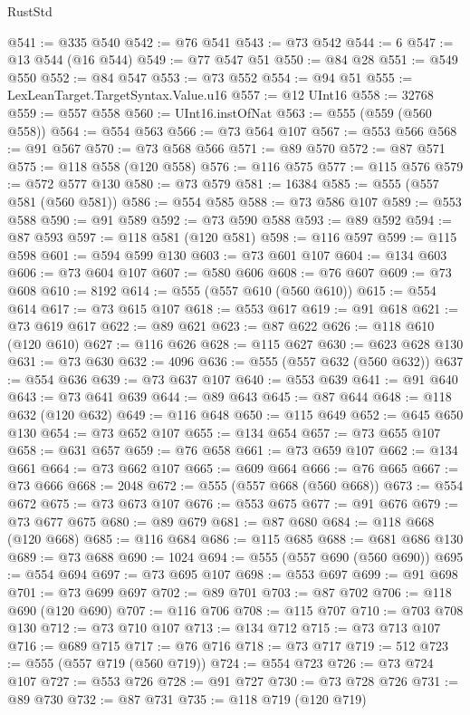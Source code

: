 \begin{lexlean}{RustStd}
\begin{coremodule}
@541 := @335 @540
@542 := @76 @541
@543 := @73 @542
@544 := 6
@547 := @13 @544 (@16 @544)
@549 := @77 @547 @51
@550 := @84 @28
@551 := @549 @550
@552 := @84 @547
@553 := @73 @552
@554 := @94 @51
@555 := LexLeanTarget.TargetSyntax.Value.u16
@557 := @12 UInt16
@558 := 32768
@559 := @557 @558
@560 := UInt16.instOfNat
@563 := @555 (@559 (@560 @558))
@564 := @554 @563
@566 := @73 @564 @107
@567 := @553 @566
@568 := @91 @567
@570 := @73 @568 @566
@571 := @89 @570
@572 := @87 @571
@575 := @118 @558 (@120 @558)
@576 := @116 @575
@577 := @115 @576
@579 := @572 @577 @130
@580 := @73 @579
@581 := 16384
@585 := @555 (@557 @581 (@560 @581))
@586 := @554 @585
@588 := @73 @586 @107
@589 := @553 @588
@590 := @91 @589
@592 := @73 @590 @588
@593 := @89 @592
@594 := @87 @593
@597 := @118 @581 (@120 @581)
@598 := @116 @597
@599 := @115 @598
@601 := @594 @599 @130
@603 := @73 @601 @107
@604 := @134 @603
@606 := @73 @604 @107
@607 := @580 @606
@608 := @76 @607
@609 := @73 @608
@610 := 8192
@614 := @555 (@557 @610 (@560 @610))
@615 := @554 @614
@617 := @73 @615 @107
@618 := @553 @617
@619 := @91 @618
@621 := @73 @619 @617
@622 := @89 @621
@623 := @87 @622
@626 := @118 @610 (@120 @610)
@627 := @116 @626
@628 := @115 @627
@630 := @623 @628 @130
@631 := @73 @630
@632 := 4096
@636 := @555 (@557 @632 (@560 @632))
@637 := @554 @636
@639 := @73 @637 @107
@640 := @553 @639
@641 := @91 @640
@643 := @73 @641 @639
@644 := @89 @643
@645 := @87 @644
@648 := @118 @632 (@120 @632)
@649 := @116 @648
@650 := @115 @649
@652 := @645 @650 @130
@654 := @73 @652 @107
@655 := @134 @654
@657 := @73 @655 @107
@658 := @631 @657
@659 := @76 @658
@661 := @73 @659 @107
@662 := @134 @661
@664 := @73 @662 @107
@665 := @609 @664
@666 := @76 @665
@667 := @73 @666
@668 := 2048
@672 := @555 (@557 @668 (@560 @668))
@673 := @554 @672
@675 := @73 @673 @107
@676 := @553 @675
@677 := @91 @676
@679 := @73 @677 @675
@680 := @89 @679
@681 := @87 @680
@684 := @118 @668 (@120 @668)
@685 := @116 @684
@686 := @115 @685
@688 := @681 @686 @130
@689 := @73 @688
@690 := 1024
@694 := @555 (@557 @690 (@560 @690))
@695 := @554 @694
@697 := @73 @695 @107
@698 := @553 @697
@699 := @91 @698
@701 := @73 @699 @697
@702 := @89 @701
@703 := @87 @702
@706 := @118 @690 (@120 @690)
@707 := @116 @706
@708 := @115 @707
@710 := @703 @708 @130
@712 := @73 @710 @107
@713 := @134 @712
@715 := @73 @713 @107
@716 := @689 @715
@717 := @76 @716
@718 := @73 @717
@719 := 512
@723 := @555 (@557 @719 (@560 @719))
@724 := @554 @723
@726 := @73 @724 @107
@727 := @553 @726
@728 := @91 @727
@730 := @73 @728 @726
@731 := @89 @730
@732 := @87 @731
@735 := @118 @719 (@120 @719)

\end{coremodule}
\end{lexlean}
